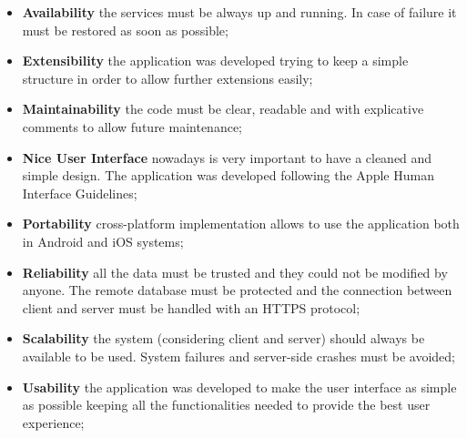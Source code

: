 \begin{itemize}
    \item \textbf{Availability} the services must be always up and running. In case of failure it must be restored as soon as possible;
    \item \textbf{Extensibility} the application was developed trying to keep a simple structure in order to allow further extensions easily;
    \item \textbf{Maintainability} the code must be clear, readable and with explicative comments to allow future maintenance;
    \item \textbf{Nice User Interface} nowadays is very important to have a cleaned and simple design. The application was developed following the Apple Human Interface Guidelines; 
    \item \textbf{Portability} cross-platform implementation allows to use the application both in Android and iOS systems;
    \item \textbf{Reliability} all the data must be trusted and they could not be modified by anyone. The remote database must be protected and the connection between client and server must be handled with an HTTPS protocol;
    \item \textbf{Scalability} the system (considering client and server) should always be available to be used. System failures and server-side crashes must be avoided; 
    \item \textbf{Usability} the application was developed to make the user interface as simple as possible keeping all the functionalities needed to provide the best user experience;
\end{itemize}
